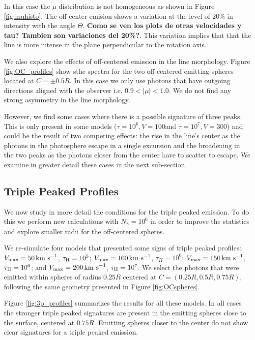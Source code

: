 \documentclass{emulateapj}
\newcommand{\kms}{{\ifmmode{{\mathrm{\,km\ s}^{-1}}}\else{\,km~s$^{-1}$}\fi}}
\begin{document}
In this case the $\mu$ distribution is not homogeneous as shown in
Figure \ref{fig:muhisto}. The off-center emision shows a variation at
the level of $20\%$ in intensity with the angle $\Theta$. {\bf Como se
ven los plots de otras velocidades y tau? Tambien son variaciones del
20\%?}. This variation implies that that the line is more intense in
the plane perpendicular to the rotation axis. 


We also explore the effects of off-centered emission in the line
morphology. Figure \ref{fig:OC_profiles} show sthe spectra for the two
off-centered emitting spheres located at $C=\pm0.5R$.  In this case we
only use photons that have outgoing directions aligned with the
observer i.e. $0.9 <\vert \mu \vert < 1.0$. We do not find any strong
asymmetry in the line morphology.  


However, we find some cases where there is a possible signature of
three peaks. This is only present in some models ($\tau = 10^6,
V=100$\kms and $\tau = 10^7, V=300$\kms) and could be the result of
two competing effects: the rise in the line's center as the photons in
the photosphere escape in a single excursion and the broadening in the
two peaks as the photons closer from the center have to scatter to
escape. We examine in greater detail these cases in the next
sub-section. 



\subsection{Triple Peaked Profiles}
\label{sec:3p}

We now study in more detail the conditions for the triple peaked
emission. To do this we perform new calculations with $N_{\gamma} =
10^6$ in order to improve the statistics and explore smaller radii for
the off-centered spheres. 

We re-simulate four models that presented some signs of triple peaked
profiles: $V_{\rm max}=50\kms$, $\tau_{\rm H}=10^{5}$; $V_{\rm
  max}=100\kms$, $\tau_{H}=10^{6}$; $V_{\rm max}=150\kms$, $\tau_{\rm
  H}=10^6$; and $V_{\rm max}=200\kms$, $\tau_{\rm H}=10^{7}$. We
select the photons that were emitted within spheres of radius $0.25R$
centered at $C=(0.25R, 0.5R, 0.75R)$, following the same
geometry presented in Figure \ref{fig:OCspheres}.

Figure \ref{fig:3p_profiles} summarizes the results for all these
models. In all cases the stronger triple peaked signatures are
present in the emitting spheres close to the surface, centered at
$0.75R$. Emitting spheres closer to the center do not show
clear signatures for a triple peaked emission. 
\end{document}
